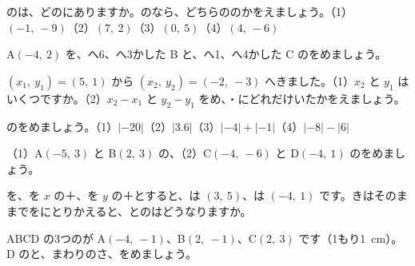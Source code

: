 \bkproblem {}のは、どのにありますか。のなら、どちらののかをえましょう。（1）$(-1,\ -9)$（2）$(7,\ 2)$（3）$(0,\ 5)$（4）$(4,\ -6)$

\bkproblem {} A$(-4,\ 2)$ を、へ6、へ3かした B と、へ1、へ4かした C のをめましょう。

\bkproblem {} $(x_1,\ y_1)=(5,\ 1)$ から $(x_2,\ y_2)=(-2,\ -3)$ へきました。（1）$x_2$ と $y_1$ はいくつですか。（2）$x_2-x_1$ と $y_2-y_1$ をめ、・にどれだけいたかをえましょう。

\bkproblem {}のをめましょう。（1）$\lvert -20\rvert $\quad（2）$\lvert 3.6\rvert $\quad（3）$\lvert -4\rvert +\lvert -1\rvert $\quad（4）$\lvert -8\rvert -\lvert 6\rvert $

\bkproblem（1）A$(-5,\ 3)$ と B$(2,\ 3)$ の、（2）C$(-4,\ -6)$ と D$(-4,\ 1)$ のをめましょう。

\bkproblem {}を、を $x$ の＋、を $y$ の＋とすると、は $(3,\ 5)$、は $(-4,\ 1)$ です。きはそのままでをにとりかえると、とのはどうなりますか。


\bkproblem {} ABCD の3つのが A$(-4,\ -1)$、B$(2,\ -1)$、C$(2,\ 3)$ です（1もり\qty{1}{cm}）。D のと、まわりのさ、をめましょう。

